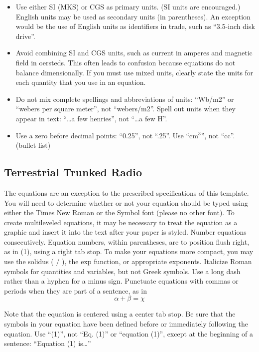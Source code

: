 \documentclass[letterpaper, 10 pt, conference]{ieeeconf}  %
\begin{document}
\begin{itemize}

\item Use either SI (MKS) or CGS as primary units. (SI units are encouraged.) English units may be used as secondary units (in parentheses). An exception would be the use of English units as identifiers in trade, such as ``3.5-inch disk drive''.
\item Avoid combining SI and CGS units, such as current in amperes and magnetic field in oersteds. This often leads to confusion because equations do not balance dimensionally. If you must use mixed units, clearly state the units for each quantity that you use in an equation.
\item Do not mix complete spellings and abbreviations of units: ``Wb/m2'' or ``webers per square meter'', not ``webers/m2''.  Spell out units when they appear in text: ``\ldots a few henries'', not ``\ldots a few H''.
\item Use a zero before decimal points: ``0.25'', not ``.25''. Use ``cm$^3$'', not ``cc''. (bullet list)

\end{itemize}


\subsection{Terrestrial Trunked Radio}

The equations are an exception to the prescribed specifications of this template. You will need to determine whether or not your equation should be typed using either the Times New Roman or the Symbol font (please no other font). To create multileveled equations, it may be necessary to treat the equation as a graphic and insert it into the text after your paper is styled. Number equations consecutively. Equation numbers, within parentheses, are to position flush right, as in (1), using a right tab stop. To make your equations more compact, you may use the solidus ( / ), the exp function, or appropriate exponents. Italicize Roman symbols for quantities and variables, but not Greek symbols. Use a long dash rather than a hyphen for a minus sign. Punctuate equations with commas or periods when they are part of a sentence, as in
\begin{equation}
\alpha + \beta = \chi
\end{equation}

Note that the equation is centered using a center tab stop. Be sure that the symbols in your equation have been defined before or immediately following the equation. Use ``(1)'', not ``Eq. (1)'' or ``equation (1)'', except at the beginning of a sentence: ``Equation (1) is\ldots''
\end{document}
